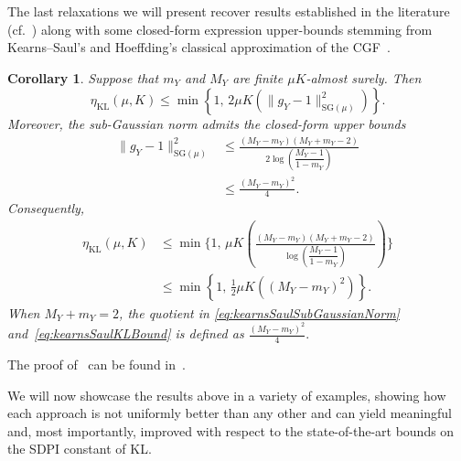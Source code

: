 \documentclass[11pt]{article}
\theoremstyle{plain}
\newtheorem{corollary}{Corollary}[section]
\theoremstyle{remark}
\begin{document}
The last relaxations we will present recover results established in the literature (cf.~\cite{sdpiRaginsky}) along with some closed-form expression upper-bounds stemming from Kearns--Saul's and Hoeffding's classical approximation of the CGF~\cite{kearnsSaul1998, berendKontorovich2013}. 
\begin{corollary}
\label{cor:subGaussianKLRelaxations}
Suppose that $m_Y$ and $M_Y$ are finite $\mu K$-almost surely.
Then
\begin{equation}
\eta_{\mathrm{KL}}(\mu,K)
\leq
\min\left\{
1,\,
2\mu K\left(
\lVert g_Y-1\rVert_{\mathrm{SG}(\mu)}^2
\right)
\right\}.
\label{eq:raginskySubGaussianBound}
\end{equation}
Moreover, the sub-Gaussian norm admits the closed-form upper bounds
\begin{align}
\lVert g_Y-1\rVert_{\mathrm{SG}(\mu)}^2
&\leq
\frac{
(M_Y-m_Y)(M_Y+m_Y-2)
}{
2\log\left(
\dfrac{M_Y-1}{1-m_Y}
\right)
}
\label{eq:kearnsSaulSubGaussianNorm}\\
&\leq
\frac{(M_Y-m_Y)^2}{4}.
\label{eq:hoeffdingSubGaussianNorm}
\end{align}
Consequently,
\begin{align}
\eta_{\mathrm{KL}}(\mu,K)
&\leq
\min\Bigg\{
1,\,
\mu K\left(
\frac{
(M_Y-m_Y)(M_Y+m_Y-2)
}{
\log\left(
\dfrac{M_Y-1}{1-m_Y}
\right)
}
\right)
\Bigg\}
\label{eq:kearnsSaulKLBound}\\
&\leq
\min\left\{
1,\,
\frac12
\mu K\left(
(M_Y-m_Y)^2
\right)
\right\}.
\label{eq:hoeffdingKLBound}
\end{align}
When $M_Y+m_Y=2$, the quotient in
\eqref{eq:kearnsSaulSubGaussianNorm} and~\eqref{eq:kearnsSaulKLBound} is defined as
$\frac{(M_Y-m_Y)^2}{4}.$
\end{corollary}

The proof of~ can be found in~.
   
   We will now showcase the results above in a variety of examples, showing how each approach is not uniformly better than any other and can yield meaningful and, most importantly, improved with respect to the state-of-the-art bounds on the SDPI constant of KL. 
\end{document}
